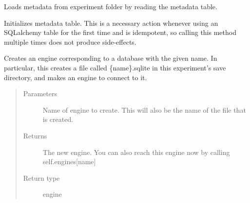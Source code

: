 \documentclass[letterpaper,10pt,english]{sphinxmanual}
\begin{document}
\begin{fulllineitems}
\begin{fulllineitems}
\end{fulllineitems}


\begin{fulllineitems}
\label{\detokenize{Fireworks:Fireworks.extensions.experiment.Experiment.load_metadata}}
Loads metadata from experiment folder by reading the metadata table.

\end{fulllineitems}


\begin{fulllineitems}
\label{\detokenize{Fireworks:Fireworks.extensions.experiment.Experiment.init_metadata}}
Initializes metadata table. This is a necessary action whenever using an SQLalchemy table for the first time and is idempotent,
so calling this method multiple times does not produce side-effects.

\end{fulllineitems}


\begin{fulllineitems}
\label{\detokenize{Fireworks:Fireworks.extensions.experiment.Experiment.get_engine}}
Creates an engine corresponding to a database with the given name. In particular, this creates a file called \{name\}.sqlite
in this experiment’s save directory, and makes an engine to connect to it.
\begin{quote}\begin{description}
\item[{Parameters}] \leavevmode
{} \textendash{} Name of engine to create. This will also be the name of the file that is created.

\item[{Returns}] \leavevmode
The new engine. You can also reach this engine now by calling self.engines{[}name{]}

\item[{Return type}] \leavevmode
engine


\end{description}
\end{quote}
\end{fulllineitems}
\end{fulllineitems}
\end{document}

